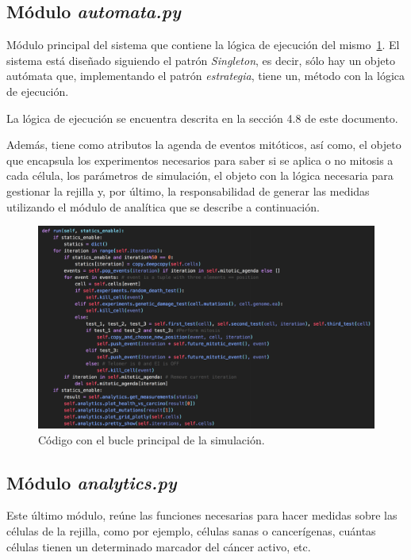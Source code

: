 \subsection{Módulo \textit{automata.py}}

Módulo principal del sistema que contiene la lógica de ejecución del mismo~\ref{fig:automata}. El sistema
está diseñado siguiendo el patrón \textit{Singleton}, es decir, sólo hay un objeto
autómata que, implementando el patrón \textit{estrategia}, tiene un, método con
la lógica de ejecución.

La lógica de ejecución se encuentra descrita en la sección 4.8 de este documento.

Además, tiene como atributos la agenda de eventos mitóticos, así como, el objeto que
encapsula los experimentos necesarios para saber si se aplica o no mitosis a cada célula, los
parámetros de simulación, el objeto con la lógica necesaria para gestionar la rejilla y, por último,
la responsabilidad de generar las medidas utilizando el módulo de analítica que se describe a continuación.

\begin{figure}[h]
\centering
\includegraphics[scale=0.45]{figures/alg}
\caption{Código con el bucle principal de la simulación.}
\label{fig:automata}
\end{figure}

\subsection{Módulo \textit{analytics.py}}

Este último módulo, reúne las funciones necesarias para hacer medidas sobre las células
de la rejilla, como por ejemplo, células sanas o cancerígenas, cuántas células tienen un
determinado marcador del cáncer activo, etc.

